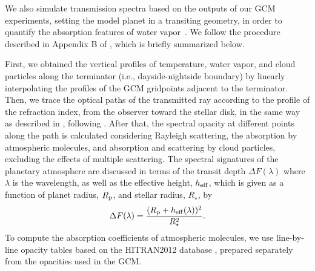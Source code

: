 \documentclass[11pt,numberedappendix,twocolappendix,]{emulateapj}
\newcommand{\dsa}[1]{{\color{blue}#1}}
\newcommand{\yf}[1]{{\color{orange}#1}}
\newcommand{\wv}{water vapor\ }
\begin{document}
We also simulate transmission spectra based on the outputs of our GCM experiments, setting the model planet in a transiting geometry, in order to quantify the absorption features of \wv.  
We follow the procedure described in Appendix B of \citet{Way2017}, which is briefly summarized below. 

First, we obtained the vertical profiles of temperature, water vapor, and cloud particles along the terminator (i.e., dayside-nightside boundary) by linearly interpolating the profiles of the GCM gridpoints adjacent to the terminator. 
Then, we trace the optical paths of the transmitted ray according to the profile of the refraction index, from the observer toward the stellar disk, in the same way as described in \citet{vanderWerf2008}, following \citet{Misra2014}. 
After that, the spectral opacity at different points along the path is calculated considering Rayleigh scattering, the absorption by atmospheric molecules, and absorption and scattering by cloud particles, excluding the effects of multiple scattering. 
The spectral signatures of the planetary atmosphere are discussed in terms of the transit depth $\Delta F(\lambda )$ where $\lambda $ is the wavelength, as well as the effective height, $h_{\rm eff}$, which is given \yf{as a function of planet radius, $R_{\rm p}$, and stellar radius, $R_{\star }$,} by 
\begin{equation}
\Delta F(\lambda) = \frac{( R_{\rm p} + h_{\rm eff}(\lambda)  )^2}{R_{\star }^2}. 
\end{equation}
To compute the absorption coefficients of atmospheric molecules, we use line-by-line opacity tables based on the HITRAN2012 database \citep{Rothman2013}, prepared separately from the opacities used in the GCM. 

\end{document}
